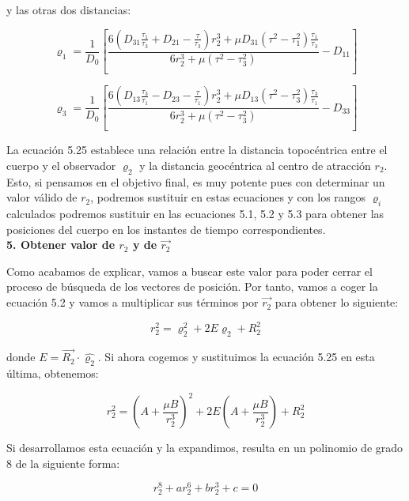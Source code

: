 \documentclass{article}
\numberwithin{equation}{section}
\begin{document}
y las otras dos distancias:

\begin{equation}
\varrho_1 = \frac{1}{D_0} \left[ \frac{6 \left( D_{31} \frac{\tau_1}{\tau_3} + D_{21} - \frac{\tau}{\tau_3} \right) r_2^3 + \mu D_{31} (\tau^2 - \tau_1^2) \frac{\tau_1}{\tau_3}}{6r_2^3 + \mu (\tau^2 - \tau_3^2)} - D_{11} \right]
\end{equation}

\begin{equation}
\varrho_3 = \frac{1}{D_0} \left[ \frac{6 \left( D_{13} \frac{\tau_3}{\tau_1} - D_{23} - \frac{\tau}{\tau_1} \right) r_2^3 + \mu D_{13} (\tau^2 - \tau_3^2) \frac{\tau_3}{\tau_1}}{6r_2^3 + \mu (\tau^2 - \tau_3^2)} - D_{33} \right]
\end{equation}

La ecuación 5.25 establece una relación entre la distancia topocéntrica entre el cuerpo y el observador $\varrho_2$ y la distancia geocéntrica al centro de atracción $r_2$. Esto, si pensamos en el objetivo final, es muy potente pues con determinar un valor válido de $r_2$, podremos sustituir en estas ecuaciones y con los rangos $\varrho_i$ calculados podremos sustituir en las ecuaciones 5.1, 5.2 y 5.3 para obtener las posiciones del cuerpo en los instantes de tiempo correspondientes.\\

\noindent\textbf{5. Obtener valor de $r_2$ y de $\overrightarrow{r_2}$}

Como acabamos de explicar, vamos a buscar este valor para poder cerrar el proceso de búsqueda de los vectores de posición. Por tanto, vamos a coger la ecuación 5.2 y vamos a multiplicar sus términos por $\overrightarrow{r_2}$ para obtener lo siguiente:

\begin{equation}
r_2^2 = \varrho_2^2 + 2E \varrho_2 + R_2^2
\end{equation}

donde $E=\overrightarrow{R_{2}}\cdot\hat{\varrho_{2}}$. Si ahora cogemos y sustituimos la ecuación 5.25 en esta última, obtenemos: 

\begin{equation}
    r_2^2 = \left( A + \frac{\mu B}{r_2^3} \right)^2 + 2E \left( A + \frac{\mu B}{r_2^3} \right) + R_2^2
\end{equation}

Si desarrollamos esta ecuación y la expandimos, resulta en un polinomio de grado 8 de la siguiente forma: 

\begin{equation}
    r_2^8 + ar_2^6 + br_2^3 + c = 0
\end{equation}
\end{document}
